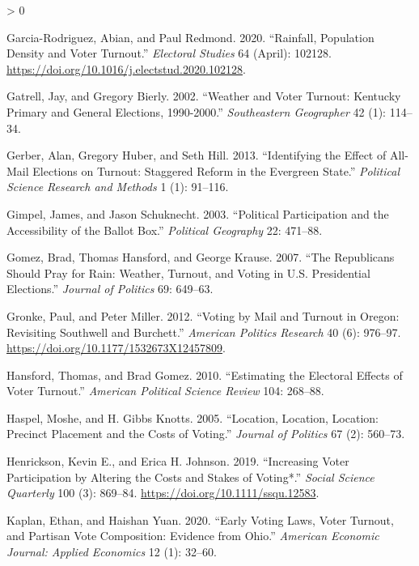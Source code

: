 \documentclass[
  12pt,
]{article}
\newlength{\cslhangindent}
\newenvironment{CSLReferences}[2] %
 {%
  \setlength{\parindent}{0pt}
  \ifodd #1 \everypar{\setlength{\hangindent}{\cslhangindent}}\ignorespaces\fi
  \ifnum #2 > 0
  \setlength{\parskip}{#2\baselineskip}
  \fi
 }%
 {}
\begin{document}
\begin{CSLReferences}{1}{0}
\leavevmode\hypertarget{ref-Garcia-Rodriguez2020}{}%
Garcia-Rodriguez, Abian, and Paul Redmond. 2020. {``Rainfall, Population Density and Voter Turnout.''} \emph{Electoral Studies} 64 (April): 102128. \url{https://doi.org/10.1016/j.electstud.2020.102128}.

\leavevmode\hypertarget{ref-Gatrell2002}{}%
Gatrell, Jay, and Gregory Bierly. 2002. {``Weather and {Voter Turnout}: {Kentucky Primary} and {General Elections}, 1990-2000.''} \emph{Southeastern Geographer} 42 (1): 114--34.

\leavevmode\hypertarget{ref-Gerber2013}{}%
Gerber, Alan, Gregory Huber, and Seth Hill. 2013. {``Identifying the {Effect} of {All}-{Mail Elections} on {Turnout}: {Staggered Reform} in the {Evergreen State}.''} \emph{Political Science Research and Methods} 1 (1): 91--116.

\leavevmode\hypertarget{ref-Gimpel2003}{}%
Gimpel, James, and Jason Schuknecht. 2003. {``Political {Participation} and the {Accessibility} of the {Ballot Box}.''} \emph{Political Geography} 22: 471--88.

\leavevmode\hypertarget{ref-Gomez2007}{}%
Gomez, Brad, Thomas Hansford, and George Krause. 2007. {``The {Republicans Should Pray} for {Rain}: {Weather}, {Turnout}, and {Voting} in {U}.{S}. {Presidential Elections}.''} \emph{Journal of Politics} 69: 649--63.

\leavevmode\hypertarget{ref-Gronke2012}{}%
Gronke, Paul, and Peter Miller. 2012. {``Voting by {Mail} and {Turnout} in {Oregon}: {Revisiting Southwell} and {Burchett}.''} \emph{American Politics Research} 40 (6): 976--97. \url{https://doi.org/10.1177/1532673X12457809}.

\leavevmode\hypertarget{ref-Hansford2010}{}%
Hansford, Thomas, and Brad Gomez. 2010. {``Estimating the {Electoral Effects} of {Voter Turnout}.''} \emph{American Political Science Review} 104: 268--88.

\leavevmode\hypertarget{ref-Haspel2005}{}%
Haspel, Moshe, and H. Gibbs Knotts. 2005. {``Location, {Location}, {Location}: {Precinct Placement} and the {Costs} of {Voting}.''} \emph{Journal of Politics} 67 (2): 560--73.

\leavevmode\hypertarget{ref-Henrickson2019}{}%
Henrickson, Kevin E., and Erica H. Johnson. 2019. {``Increasing {Voter Participation} by {Altering} the {Costs} and {Stakes} of {Voting}*.''} \emph{Social Science Quarterly} 100 (3): 869--84. \url{https://doi.org/10.1111/ssqu.12583}.

\leavevmode\hypertarget{ref-Kaplan2020}{}%
Kaplan, Ethan, and Haishan Yuan. 2020. {``Early {Voting Laws}, {Voter Turnout}, and {Partisan Vote Composition}: {Evidence} from {Ohio}.''} \emph{American Economic Journal: Applied Economics} 12 (1): 32--60.


\end{CSLReferences}
\end{document}
